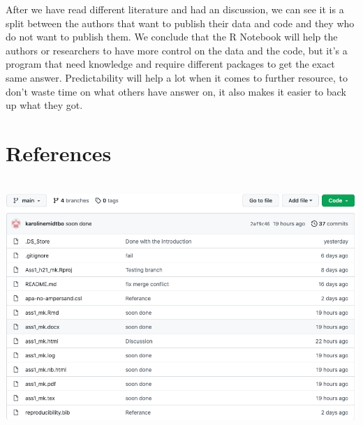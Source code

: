 \documentclass[
  12pt,
  norsk,
]{article}
\begin{document}
After we have read different literature and had an discussion, we can
see it is a split between the authors that want to publish their data
and code and they who do not want to publish them. We conclude that the
R Notebook will help the authors or researchers to have more control on
the data and the code, but it's a program that need knowledge and
require different packages to get the exact same answer. Predictability
will help a lot when it comes to further resource, to don't waste time
on what others have answer on, it also makes it easier to back up what
they got.

\hypertarget{references}{%
\section{References}\label{references}}

\hypertarget{section}{%
\section*{\texorpdfstring{\protect\includegraphics{images/Skjermbilde 2021-09-15 kl. 10.29.21.png}}{}}\label{section}}
\end{document}
